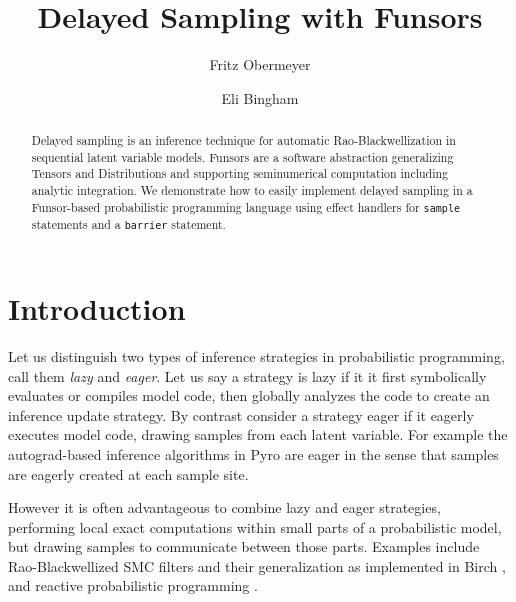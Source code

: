 \documentclass[anonymous=false, %
               format=acmsmall, %
               review=true, %
               screen=true, %
               nonacm=true]{acmart}
\begin{document}
\title{Delayed Sampling with Funsors}

\author{Fritz Obermeyer}

\author{Eli Bingham}

\begin{abstract}
Delayed sampling is an inference technique for automatic Rao-Blackwellization in sequential latent variable models.
Funsors are a software abstraction generalizing Tensors and Distributions and supporting seminumerical computation including analytic integration.
We demonstrate how to easily implement delayed sampling in a Funsor-based probabilistic programming language using effect handlers for \texttt{sample} statements and a \texttt{barrier} statement.
\end{abstract}

\maketitle

\section{Introduction}

Let us distinguish two types of inference strategies in probabilistic programming, call them \emph{lazy} and \emph{eager}.
Let us say a strategy is lazy if it it first symbolically evaluates or compiles model code, then globally analyzes the code to create an inference update strategy.
By contrast consider a strategy eager if it eagerly executes model code, drawing samples from each latent variable.
For example the autograd-based inference algorithms in Pyro \cite{bingham2018pyro} are eager in the sense that samples are eagerly created at each sample site.

However it is often advantageous to combine lazy and eager strategies, performing local exact computations within small parts of a probabilistic model, but drawing samples to communicate between those parts.
Examples include Rao-Blackwellized SMC filters and their generalization as implemented in Birch \cite{murray2017delayed}, and reactive probabilistic programming \cite{baudart2019reactive}.
\end{document}
